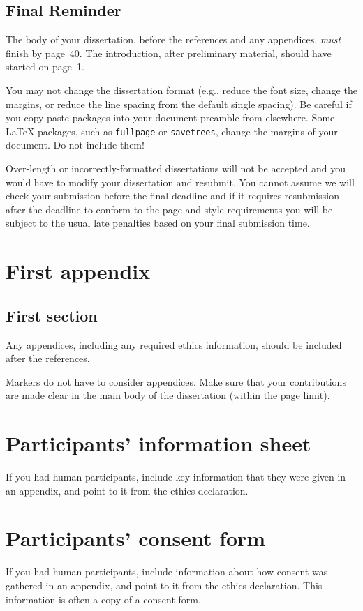 \documentclass[logo,bsc,singlespacing,parskip]{infthesis}
\begin{document}
\section{Final Reminder}

The body of your dissertation, before the references and any appendices,
\emph{must} finish by page~40. The introduction, after preliminary material,
should have started on page~1.

You may not change the dissertation format (e.g., reduce the font size, change
the margins, or reduce the line spacing from the default single spacing). Be
careful if you copy-paste packages into your document preamble from elsewhere.
Some \LaTeX{} packages, such as \texttt{fullpage} or \texttt{savetrees}, change
the margins of your document. Do not include them!

Over-length or incorrectly-formatted dissertations will not be accepted and you
would have to modify your dissertation and resubmit. You cannot assume we will
check your submission before the final deadline and if it requires resubmission
after the deadline to conform to the page and style requirements you will be
subject to the usual late penalties based on your final submission time.

% 




\appendix

\chapter{First appendix}

\section{First section}

Any appendices, including any required ethics information, should be included
after the references.

Markers do not have to consider appendices. Make sure that your contributions
are made clear in the main body of the dissertation (within the page limit).

\chapter{Participants' information sheet}

If you had human participants, include key information that they were given in
an appendix, and point to it from the ethics declaration.

\chapter{Participants' consent form}

If you had human participants, include information about how consent was
gathered in an appendix, and point to it from the ethics declaration.
This information is often a copy of a consent form.
\end{document}
